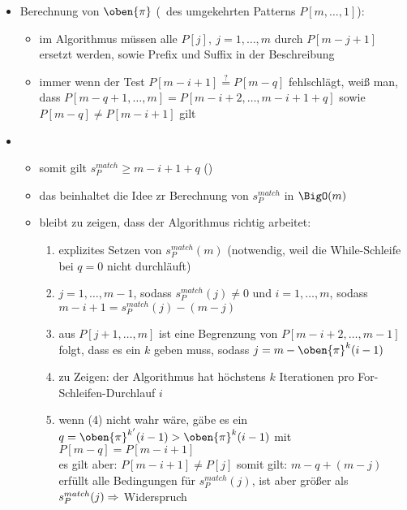 \begin{itemize}[itemsep=-2pt]
\begin{enumerate}
				
		\end{enumerate}
	\item Berechnung von $\oben{\pi}$ (\bound~des umgekehrten Patterns $P[m,\dots,1]$):
		\begin{itemize}[itemsep=-2pt]
			\item im Algorithmus müssen alle $P[j],~j=1,\dots,m$ durch $P[m-j+1]$ ersetzt werden, sowie Prefix und Suffix in der Beschreibung
			\item immer wenn der Test $P[m-i+1]\overset{?}{=}P[m-q]$ fehlschlägt, weiß man, dass $P[m-q+1,\dots,m]=P[m-i+2,\dots,m-i+1+q]$ sowie $P[m-q]\neq P[m-i+1]$ gilt\\\up
			
		\end{itemize}
\end{itemize}
\topbreak
\up\up
\begin{itemize}
	\item[]
		\begin{itemize}
			\item somit gilt $s_P^{match}\geq m-i+1+q$ ()
			\item das beinhaltet die Idee zr Berechnung von $s_P^{match}$ in $\BigO(m)$
			\item bleibt zu zeigen, dass der Algorithmus richtig arbeitet:
				\begin{enumerate}
					\item explizites Setzen von $s_P^{match}(m)$ (notwendig, weil die While-Schleife bei $q=0$ nicht durchläuft)
					\item $j=1,\dots,m-1$, sodass $s_P^{match}(j)\neq 0$ und $i=1,\dots,m$, sodass $m-i+1=s_P^{match}(j)-(m-j)$\\\up
						
					\item aus $P[j+1,\dots,m]$ ist eine Begrenzung von $P[m-i+2,\dots,m-1]$ folgt, dass es ein $k$ geben muss, sodass $j=m-\oben{\pi}^k(i-1)$
					\item zu Zeigen: der Algorithmus hat höchstens $k$ Iterationen pro For-Schleifen-Durchlauf $i$
					\item wenn (4) nicht wahr wäre, gäbe es ein $q=\oben{\pi}^{k'}(i-1) > \oben{\pi}^k(i-1)$ mit $P[m-q]=P[m-i+1]$\\
					es gilt aber: $P[m-i+1]\neq P[j]$ somit gilt: $m-q+(m-j)$ erfüllt alle Bedingungen für $s_P^{match}(j)$, ist aber größer als $s_P^{match}(j)\\
					\Rightarrow$ Widerspruch
				\end{enumerate}
		\end{itemize}
\end{itemize}